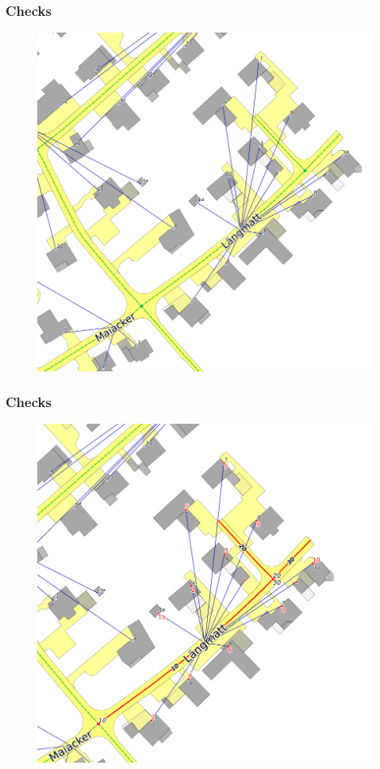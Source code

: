 \documentclass{beamer}
\begin{document}
\begin{frame}
  \frametitle{Checks}
  \begin{figure}
    \includegraphics[scale=0.3]{bilder/veriso_spinnennetz_2.png}
  \end{figure}
\end{frame}

\begin{frame}
  \frametitle{Checks}
  \begin{figure}
    \includegraphics[scale=0.3]{bilder/veriso_f12.png}
  \end{figure}
\end{frame}
\end{document}
